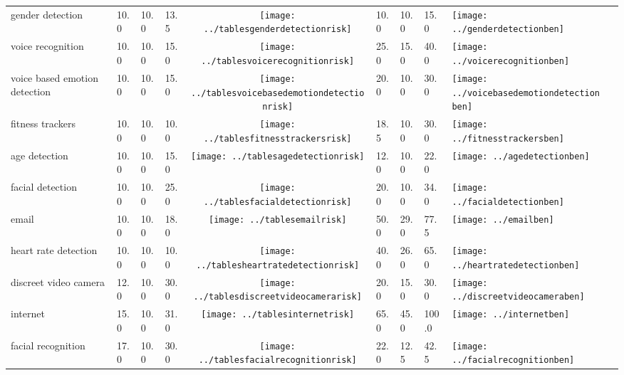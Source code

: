 \begin{table}[t]
\begin{center}
\begin{tabular}{| p{2cm} | p{1cm} | p{1cm} | p{1cm} | c | p{2cm} | p{1cm} | p{1cm} | p{1cm} | c |}
gender detection & 10.0 & 10.0 & 13.5 & \texttt{[image: ../tablesgenderdetectionrisk]} & 10.0 & 10.0 & 15.0 & \texttt{[image: ../genderdetectionben]} \\ 
voice recognition & 10.0 & 10.0 & 15.0 & \texttt{[image: ../tablesvoicerecognitionrisk]} & 25.0 & 15.0 & 40.0 & \texttt{[image: ../voicerecognitionben]} \\ 
voice based emotion detection & 10.0 & 10.0 & 15.0 & \texttt{[image: ../tablesvoicebasedemotiondetectionrisk]} & 20.0 & 10.0 & 30.0 & \texttt{[image: ../voicebasedemotiondetectionben]} \\ 
fitness trackers & 10.0 & 10.0 & 10.0 & \texttt{[image: ../tablesfitnesstrackersrisk]} & 18.5 & 10.0 & 30.0 & \texttt{[image: ../fitnesstrackersben]} \\ 
age detection & 10.0 & 10.0 & 15.0 & \texttt{[image: ../tablesagedetectionrisk]} & 12.0 & 10.0 & 22.0 & \texttt{[image: ../agedetectionben]} \\ 
facial detection & 10.0 & 10.0 & 25.0 & \texttt{[image: ../tablesfacialdetectionrisk]} & 20.0 & 10.0 & 34.0 & \texttt{[image: ../facialdetectionben]} \\ 
email & 10.0 & 10.0 & 18.0 & \texttt{[image: ../tablesemailrisk]} & 50.0 & 29.0 & 77.5 & \texttt{[image: ../emailben]} \\ 
heart rate detection & 10.0 & 10.0 & 10.0 & \texttt{[image: ../tablesheartratedetectionrisk]} & 40.0 & 26.0 & 65.0 & \texttt{[image: ../heartratedetectionben]} \\ 
discreet video camera & 12.0 & 10.0 & 30.0 & \texttt{[image: ../tablesdiscreetvideocamerarisk]} & 20.0 & 15.0 & 30.0 & \texttt{[image: ../discreetvideocameraben]} \\ 
internet & 15.0 & 10.0 & 31.0 & \texttt{[image: ../tablesinternetrisk]} & 65.0 & 45.0 & 100.0 & \texttt{[image: ../internetben]} \\ 
facial recognition & 17.0 & 10.0 & 30.0 & \texttt{[image: ../tablesfacialrecognitionrisk]} & 22.0 & 12.5 & 42.5 & \texttt{[image: ../facialrecognitionben]} \\ 

\end{tabular}
\end{center}
\end{table}
